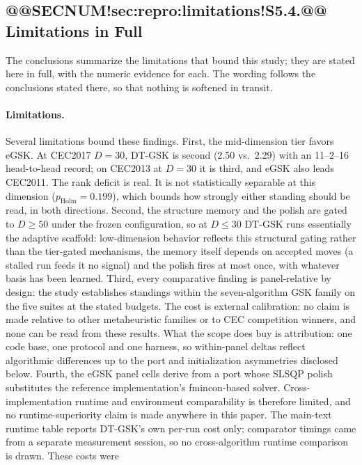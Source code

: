 \documentclass[10pt,a4paper]{article}
\newcommand{\dtgsk}{DT-GSK}
\newcommand{\egsk}{eGSK}
\begin{document}
\subsection{@@SECNUM!sec:repro:limitations!S5.4.@@ Limitations in Full}\label{sec:repro:limitations}

The conclusions summarize the limitations that bound this study; they are
stated here in full, with the numeric evidence for each. The wording
follows the conclusions stated there, so that nothing is
softened in transit.


\paragraph{Limitations.}
Several limitations bound these findings. First, the mid-dimension tier
favors \egsk{}. At CEC2017 $D = 30$, \dtgsk{} is second (2.50
vs.\ 2.29) with an 11--2--16 head-to-head record; on CEC2013 at
$D = 30$ it is third, and \egsk{} also leads CEC2011. The rank deficit
is real. It is not statistically separable at this dimension
($p_{\mathrm{Holm}} = 0.199$), which bounds how strongly either standing
should be read, in both directions. 
Second, the structure memory and the polish are gated to $D \geq 50$
under the frozen configuration, so at $D \leq 30$ \dtgsk{} runs essentially
the adaptive scaffold: low-dimension behavior reflects this structural
gating rather than the tier-gated mechanisms, the memory itself depends
on accepted moves (a stalled run feeds it no signal) and the
polish fires at most once, with whatever basis has been
learned. 
Third, every comparative finding is panel-relative by design: the study
establishes standings within the seven-algorithm GSK family on the five
suites at the stated budgets. The cost is external calibration: no
claim is made relative to other metaheuristic families or to CEC
competition winners, and none can be read from these results. What the
scope does buy is attribution: one code base, one protocol and one
harness, so within-panel deltas reflect algorithmic differences up to the
port and initialization asymmetries disclosed below. 
Fourth, the \egsk{} panel cells derive from a port whose SLSQP polish
substitutes the reference implementation's fmincon-based solver. Cross-implementation
runtime and environment comparability is therefore limited, and no
runtime-superiority claim is made anywhere in this paper. The main-text runtime table reports
\dtgsk{}'s own per-run cost only; comparator timings came from a separate
measurement session, so no cross-algorithm runtime comparison is drawn. These costs were
\end{document}
